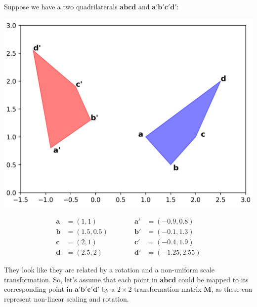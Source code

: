 \documentclass{csci1430}
\begin{document}
\begin{question}[points=10,drawbox=false]
Suppose we have a two quadrilaterals $\mathbf{abcd}$ and $\mathbf{a'b'c'd'}$:

\begin{minipage}[c]{0.49\textwidth}
    \includegraphics[width=\textwidth]{images/quads_lstsq.png}
\end{minipage}
\begin{minipage}[c]{0.49\textwidth}
    \begin{equation*}
    \begin{split}
    \mathbf{a}&=(1, 1)\\
    \mathbf{b}&=(1.5, 0.5)\\
    \mathbf{c}&=(2, 1)\\
    \mathbf{d}&=(2.5, 2)
    \end{split}
    \quad\quad\quad
    \begin{split}
    \mathbf{a'}&=(-0.9, 0.8)\\
    \mathbf{b'}&=(-0.1, 1.3)\\
    \mathbf{c'}&=(-0.4, 1.9)\\
    \mathbf{d'}&=(-1.25, 2.55)
    \end{split}
    \end{equation*}
\end{minipage}

They look like they are related by a rotation and a non-uniform scale transformation. So, let's assume that each point in $\mathbf{abcd}$ could be mapped to its corresponding point in $\mathbf{a'b'c'd'}$ by a $2\times2$ transformation matrix $\mathbf{M}$, as these can represent non-linear scaling and rotation.


\end{question}
\end{document}
